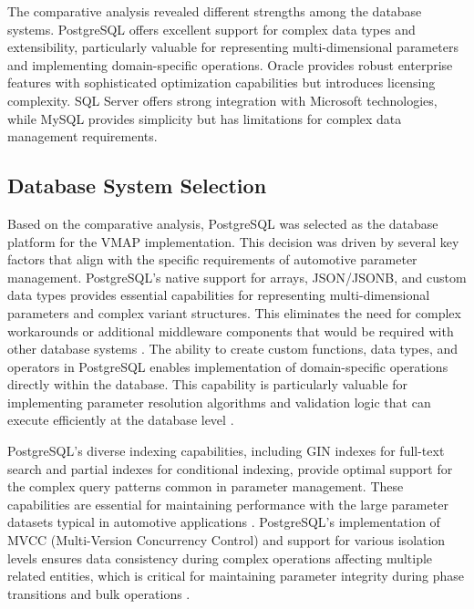 The comparative analysis revealed different strengths among the database systems. PostgreSQL offers excellent support for complex data types and extensibility, particularly valuable for representing multi-dimensional parameters and implementing domain-specific operations. Oracle provides robust enterprise features with sophisticated optimization capabilities but introduces licensing complexity. SQL Server offers strong integration with Microsoft technologies, while MySQL provides simplicity but has limitations for complex data management requirements.

\subsection{Database System Selection}
\label{subsec:database-system-selection}

Based on the comparative analysis, PostgreSQL was selected as the database platform for the \ac{VMAP} implementation. This decision was driven by several key factors that align with the specific requirements of automotive parameter management. PostgreSQL's native support for arrays, JSON/JSONB, and custom data types provides essential capabilities for representing multi-dimensional parameters and complex variant structures. This eliminates the need for complex workarounds or additional middleware components that would be required with other database systems \cite{obe2017postgresql}. The ability to create custom functions, data types, and operators in PostgreSQL enables implementation of domain-specific operations directly within the database. This capability is particularly valuable for implementing parameter resolution algorithms and validation logic that can execute efficiently at the database level \cite{obe2017postgresql}.

PostgreSQL's diverse indexing capabilities, including GIN indexes for full-text search and partial indexes for conditional indexing, provide optimal support for the complex query patterns common in parameter management. These capabilities are essential for maintaining performance with the large parameter datasets typical in automotive applications \cite{obe2017postgresql}. PostgreSQL's implementation of MVCC (Multi-Version Concurrency Control) and support for various isolation levels ensures data consistency during complex operations affecting multiple related entities, which is critical for maintaining parameter integrity during phase transitions and bulk operations \cite{obe2017postgresql}.

